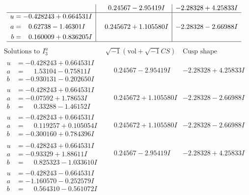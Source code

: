 \documentclass[1p]{elsarticle_modified}
\theoremstyle{definition}
\newcommand{\I}{\sqrt{-1}}
\begin{document}
$$\begin{array}{c|c|c}
 & \phantom{-}0.24567 - 2.95419 I & -2.28328 + 4.25833 I \\ \hline\begin{aligned}
u &= -0.428243 + 0.664531 I \\
a &= \phantom{-}0.62738 - 1.46301 I \\
b &= \phantom{-}0.160009 + 0.836205 I\end{aligned}
 & \phantom{-}0.245672 + 1.105580 I & -2.28328 - 2.66988 I\\
 \hline 
 \end{array}$$\newpage$$\begin{array}{c|c|c}  
\text{Solutions to }I^u_{3}& \I (\text{vol} + \sqrt{-1}CS) & \text{Cusp shape}\\
 \hline 
\begin{aligned}
u &= -0.428243 + 0.664531 I \\
a &= \phantom{-}1.53104 - 0.75811 I \\
b &= -0.930131 - 0.202650 I\end{aligned}
 & \phantom{-}0.24567 - 2.95419 I & -2.28328 + 4.25833 I \\ \hline\begin{aligned}
u &= -0.428243 + 0.664531 I \\
a &= -0.07592 + 1.78653 I \\
b &= \phantom{-}0.33288 - 1.46152 I\end{aligned}
 & \phantom{-}0.245672 + 1.105580 I & -2.28328 - 2.66988 I \\ \hline\begin{aligned}
u &= -0.428243 + 0.664531 I \\
a &= \phantom{-}0.119257 + 0.105054 I \\
b &= -0.300160 + 0.784396 I\end{aligned}
 & \phantom{-}0.245672 + 1.105580 I & -2.28328 - 2.66988 I \\ \hline\begin{aligned}
u &= -0.428243 + 0.664531 I \\
a &= -0.93329 + 1.88611 I \\
b &= \phantom{-}0.825323 - 1.033610 I\end{aligned}
 & \phantom{-}0.24567 - 2.95419 I & -2.28328 + 4.25833 I \\ \hline\begin{aligned}
u &= -0.428243 - 0.664531 I \\
a &= -1.160570 - 0.252579 I \\
b &= \phantom{-}0.564310 - 0.561072 I\end{aligned}

\end{array}$$
\end{document}
